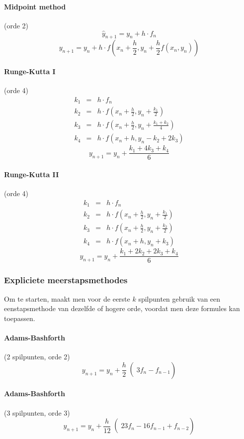 \paragraph{Midpoint method} (orde 2)
\[
  \hat{y}_{n+1} = y_n + h \cdot f_n
\]
\[
  y_{n+1} = y_n + h \cdot f\left(x_n + \frac{h}{2}, y_n + \frac{h}{2} f(x_n,y_n) \right)
\]

\paragraph{Runge-Kutta I} (orde 4)
\begin{eqnarray*}
  k_1 & = & h\cdot f_n\\
  k_2 & = & h\cdot f\left(x_n+\frac{h}{2},y_n+\frac{k_1}{2}\right)\\
  k_3 & = & h\cdot f\left(x_n+\frac{h}{2},y_n+\frac{k_1+k_2}{4}\right)\\
  k_4 & = & h\cdot f\left(x_n+h,y_n-k_2+2k_3\right)
\end{eqnarray*}
\[
  y_{n+1} = y_n + \frac{k_1 + 4k_3 + k_4}{6}
\]

\paragraph{Runge-Kutta II} (orde 4)
\begin{eqnarray*}
  k_1 & = & h\cdot f_n\\
  k_2 & = & h\cdot f\left(x_n+\frac{h}{2},y_n+\frac{k_1}{2}\right)\\
  k_3 & = & h\cdot f\left(x_n+\frac{h}{2},y_n+\frac{k_2}{2}\right)\\
  k_4 & = & h\cdot f\left(x_n+h,y_n+k_3\right)
\end{eqnarray*}
\[
  y_{n+1} = y_n + \frac{k_1 + 2k_2 + 2k_3 + k_4}{6}
\]

\subsubsection{Expliciete meerstapsmethodes}
Om te starten, maakt men voor de eerste $k$ spilpunten gebruik van een eenstapsmethode van dezelfde of hogere orde, voordat men deze formules kan toepassen.

\paragraph{Adams-Bashforth} (2 spilpunten, orde 2)
\[
  y_{n+1} = y_n + \left.\left. \frac{h}{2} \right( 3f_n - f_{n-1}\right)
\]

\paragraph{Adams-Bashforth} (3 spilpunten, orde 3)
\[
  y_{n+ 1} = y_n + \left.\left. \frac{h}{12} \right( 23f_n - 16f_{n-1} + f_{n-2}\right)
\]

